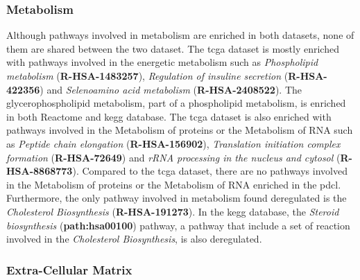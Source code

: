\subsubsection{Metabolism}

Although pathways involved in metabolism are enriched in both datasets, none of them are shared between the two dataset.
The \acrshort{tcga} dataset is mostly enriched with pathways involved in the energetic metabolism such as \textit{Phospholipid metabolism} (\textbf{R-HSA-1483257}), \textit{Regulation of insuline secretion} (\textbf{R-HSA-422356}) and \textit{Selenoamino acid metabolism} (\textbf{R-HSA-2408522}).
The glycerophospholipid metabolism, part of a phospholipid metabolism, is enriched in both Reactome and \acrshort{kegg} database.
The \acrshort{tcga} dataset is also enriched with pathways involved in the Metabolism of proteins or the Metabolism of RNA such as \textit{Peptide chain elongation} (\textbf{R-HSA-156902}), \textit{Translation initiation complex formation} (\textbf{R-HSA-72649}) and \textit{rRNA processing in the nucleus and cytosol} (\textbf{R-HSA-8868773}).
Compared to the \acrshort{tcga} dataset, there are no pathways involved in the Metabolism of proteins or the Metabolism of RNA enriched in the \acrshort{pdcl}.
Furthermore, the only pathway involved in metabolism found deregulated is the \textit{Cholesterol Biosynthesis} (\textbf{R-HSA-191273}).
In the \acrshort{kegg} database, the \textit{Steroid biosynthesis} (\textbf{path:hsa00100}) pathway, a pathway that include a set of reaction involved in the \textit{Cholesterol Biosynthesis}, is also deregulated.

\subsubsection{Extra-Cellular Matrix}



